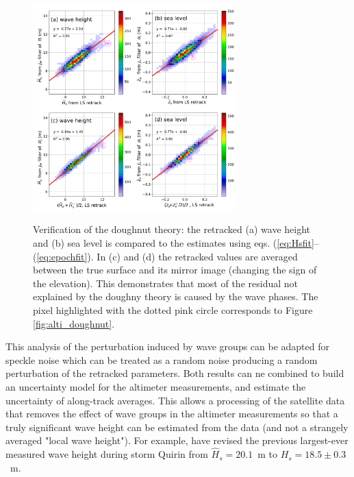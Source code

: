 \begin{figure}[h!]
\centerline{\includegraphics[width=0.7\textwidth]{FIGS_CH_SAT/verification-of-the-altimeter-doughnut-footprint-theory.png}}
  \caption{Verification of the doughnut theory: the retracked (a) wave height and (b) sea level is compared to the estimates using eqs. (\ref{eq:Hsfit}--(\ref{eq:epochfit}). In (c) and (d) the retracked values are averaged between the true surface and its mirror image (changing the sign of the elevation). This demonstrates that most of the residual not explained by the doughny theory is caused by the wave phases. The pixel highlighted with the dotted pink circle corresponds to Figure \ref{fig:alti_doughnut}.}{} \label{fig:alti_doughnut2}
\end{figure}

This  analysis of the perturbation induced by wave groups can be adapted for speckle noise which can be treated as a random noise producing a random perturbation of the retracked parameters.  Both results can ne combined to build an uncertainty model for the altimeter measurements, and estimate the uncertainty of along-track averages. This allows a processing of the satellite data that removes the effect of wave groups in the altimeter measurements so that a truly significant wave height can be estimated from the data (and not a strangely averaged "local wave height"). For example, \cite{DeCarlo&Ardhuin2024} have revised the previous largest-ever measured wave height during storm Quirin from $\widehat{H}_s=20.1$~m \citep{Hanafin&al.2012} to $H_s=18.5 \pm 0.3$~m.

